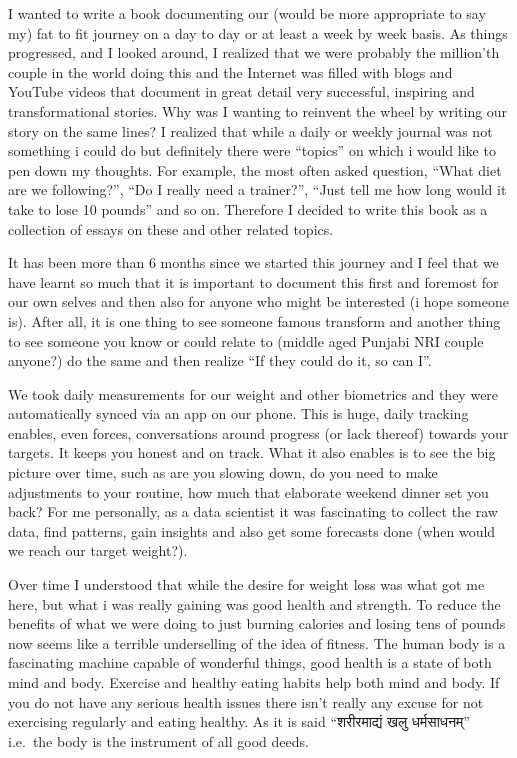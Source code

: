 \documentclass[oneside]{book}
\begin{document}
I wanted to write a book documenting our (would be more appropriate to
say my) fat to fit journey on a day to day or at least a week by week
basis. As things progressed, and I looked around, I realized that we
were probably the million'th couple in the world doing this and the
Internet was filled with blogs and YouTube videos that document in great
detail very successful, inspiring and transformational stories. Why was
I wanting to reinvent the wheel by writing our story on the same lines?
I realized that while a daily or weekly journal was not something i
could do but definitely there were ``topics'' on which i would like to
pen down my thoughts. For example, the most often asked question, ``What
diet are we following?'', ``Do I really need a trainer?'', ``Just tell
me how long would it take to lose 10 pounds'' and so on. Therefore I
decided to write this book as a collection of essays on these and other
related topics.

It has been more than 6 months since we started this journey and I feel
that we have learnt so much that it is important to document this first
and foremost for our own selves and then also for anyone who might be
interested (i hope someone is). After all, it is one thing to see
someone famous transform and another thing to see someone you know or
could relate to (middle aged Punjabi NRI couple anyone?) do the same and
then realize ``If they could do it, so can I''.

We took daily measurements for our weight and other biometrics and they
were automatically synced via an app on our phone. This is huge, daily
tracking enables, even forces, conversations around progress (or lack
thereof) towards your targets. It keeps you honest and on track. What it
also enables is to see the big picture over time, such as are you
slowing down, do you need to make adjustments to your routine, how much
that elaborate weekend dinner set you back? For me personally, as a data
scientist it was fascinating to collect the raw data, find patterns,
gain insights and also get some forecasts done (when would we reach our
target weight?).

Over time I understood that while the desire for weight loss was what
got me here, but what i was really gaining was good health and strength.
To reduce the benefits of what we were doing to just burning calories
and losing tens of pounds now seems like a terrible underselling of the
idea of fitness. The human body is a fascinating machine capable of
wonderful things, good health is a state of both mind and body. Exercise
and healthy eating habits help both mind and body. If you do not have
any serious health issues there isn't really any excuse for not
exercising regularly and eating healthy. As it is said ``शरीरमाद्यं खलु
धर्मसाधनम्'' i.e.~the body is the instrument of all good deeds.
\end{document}
